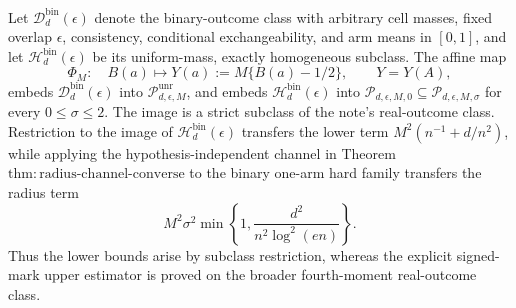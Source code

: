 Let \(\mathcal D_d^{\mathrm{bin}}(\epsilon)\) denote the binary-outcome class with arbitrary cell masses, fixed overlap \(\epsilon\), consistency, conditional exchangeability, and arm means in \([0,1]\), and let \(\mathcal H_d^{\mathrm{bin}}(\epsilon)\) be its uniform-mass, exactly homogeneous subclass.  The affine map
\[
 \Phi_M:\quad B(a)\longmapsto Y(a):=M\{B(a)-1/2\},\qquad Y=Y(A),
\]
embeds \(\mathcal D_d^{\mathrm{bin}}(\epsilon)\) into \(\mathcal P_{d,\epsilon,M}^{\mathrm{unr}}\), and embeds \(\mathcal H_d^{\mathrm{bin}}(\epsilon)\) into \(\mathcal P_{d,\epsilon,M,0}\subseteq\mathcal P_{d,\epsilon,M,\sigma}\) for every \(0\le\sigma\le2\).  The image is a strict subclass of the note's real-outcome class.  Restriction to the image of \(\mathcal H_d^{\mathrm{bin}}(\epsilon)\) transfers the lower term \(M^2(n^{-1}+d/n^2)\), while applying the hypothesis-independent channel in Theorem~\(\mathrm{thm:radius\text{-}channel\text{-}converse}\) to the binary one-arm hard family transfers the radius term
\[
 M^2\sigma^2\min\left\{1,\frac{d^2}{n^2\log^2(en)}\right\}.
\]
Thus the lower bounds arise by subclass restriction, whereas the explicit signed-mark upper estimator is proved on the broader fourth-moment real-outcome class.